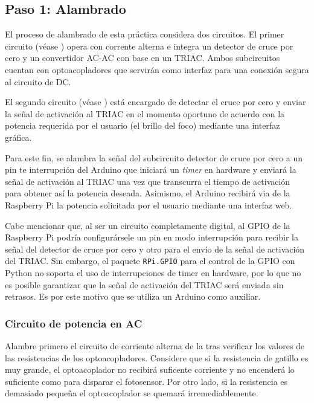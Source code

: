 %
%


\subsection{Paso 1: Alambrado}%
\label{sec:step1}

El proceso de alambrado de esta práctica considera dos circuitos.
El primer circuito (véase ) opera con corrente alterna e integra un detector de cruce por cero y un convertidor AC-AC con base en un TRIAC.
Ambos subcircuitos cuentan con optoacopladores que servirán como interfaz para una conexión segura al circuito de DC.

El segundo circuito (véase ) está encargado de detectar el cruce por cero y enviar la señal de activación al TRIAC en el momento oportuno de acuerdo con la potencia requerida por el usuario (el brillo del foco) mediante una interfaz gráfica.

Para este fin, se alambra la señal del subcircuito detector de cruce por cero a un pin te interrupción del Arduino que iniciará un \emph{timer} en hardware y enviará la señal de activación al TRIAC una vez que transcurra el tiempo de activación para obtener así la potencia deseada.
Asimismo, el Arduino recibirá via \IIC de la Raspberry Pi la potencia solicitada por el usuario mediante una interfaz web.

Cabe mencionar que, al ser un circuito completamente digital, al GPIO de la Raspberry Pi podría configurársele un pin en modo interrupción para recibir la señal del detector de cruce por cero y otro para el envío de la señal de activación del TRIAC.
Sin embargo, el paquete \texttt{RPi.GPIO} para el control de la GPIO con Python no soporta el uso de interrupciones de timer en hardware, por lo que no es posible garantizar que la señal de activación del TRIAC será enviada sin retrasos.
Es por este motivo que se utiliza un Arduino como auxiliar.

\subsubsection{Circuito de potencia en AC}%
Alambre primero el circuito de corriente alterna de la  tras verificar los valores de las resistencias de los optoacopladores.
Considere que si la resistencia de gatillo es muy grande, el optoacoplador no recibirá suficente corriente y no encenderá lo suficiente como para disparar el fotosensor.
Por otro lado, si la resistencia es demasiado pequeña el optoacoplador se quemará irremediablemente.

